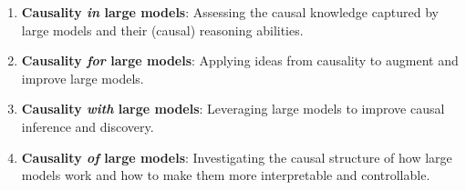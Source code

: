 \documentclass{article}
\begin{document}

\begin{enumerate}[nolistsep]
    \item \textbf{Causality \textit{in} large models}: Assessing the causal knowledge captured by large models and their (causal) reasoning abilities.
    \item \textbf{Causality \textit{for} large models}: Applying ideas from causality to augment and improve large models.
    \item \textbf{Causality \textit{with} large models}: Leveraging large models to improve causal inference and discovery.
    \item \textbf{Causality \textit{of} large models}: Investigating the causal structure of how large models work and how to make them more interpretable and controllable. 
\end{enumerate}
\end{document}
